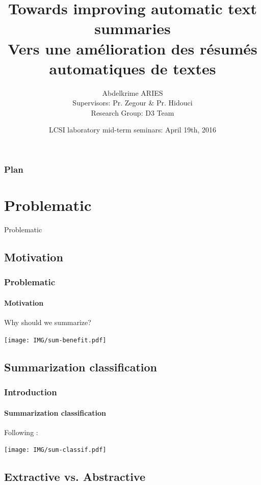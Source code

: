 \documentclass{beamer}
\title[Towards improving automatic text summaries \hspace*{2cm}  \textbf{\footnotesize  \insertframenumber/\inserttotalframenumber} ] %
{Towards improving automatic text summaries \\ {\scriptsize Vers une amélioration des résumés automatiques de textes}}
\institute{ %
École  nationale Supérieure d'Informatique (ESI, ex. INI), Algérie  %
}
\author[Abdelkrime ARIES  (ESI 2016)] %
{Abdelkrime ARIES\\ {\footnotesize %
Supervisors: Pr. Zegour \& Pr. Hidouci \\
Research Group: D3 Team}}
\date{LCSI laboratory mid-term seminars: April 19th, 2016} %
\begin{document}

\begin{frame}[plain]
\maketitle
\end{frame}


\begin{frame}
\frametitle{Plan}
{\footnotesize \tableofcontents[hideothersubsections]}
\end{frame}

\section{Problematic}

\begin{frame}
\begin{center}
{\Huge Problematic}
\end{center}
\end{frame}

\subsection{Motivation}

\begin{frame}
\frametitle{Problematic}
\framesubtitle{Motivation}

Why should we summarize?
\begin{center}
\texttt{[image: IMG/sum-benefit.pdf]}
\end{center}

\end{frame}

\subsection{Summarization classification}

\begin{frame}
\frametitle{Introduction}
\framesubtitle{Summarization classification}
Following \cite{98-hovy-lin,99-sparckjones}:
\begin{center}
\texttt{[image: IMG/sum-classif.pdf]}
\end{center}
\end{frame}

\subsection{Extractive vs. Abstractive}
\end{document}

